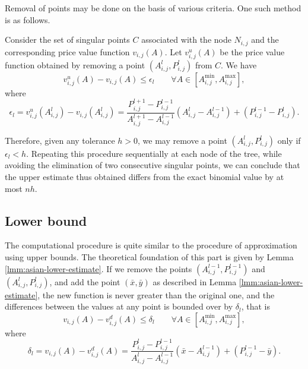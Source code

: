 Removal of points may be done on the basis of various criteria. One such method is as follows.

Consider the set of singular points $ C $ associated with the node $ N_{i,j} $ and the corresponding price value function $ v_{i,j} (A) $. Let $ v_{i,j}^u (A) $ be the price value function obtained by removing a point $ \left( A_{i,j}^{l}, P_{i,j}^{l} \right) $ from $ C $. We have
\begin{equation}
	v_{i,j}^u (A) - v_{i,j} (A)  \le  \epsilon_l  \qquad  \forall A \in \left[ A_{i,j}^{\min}, A_{i,j}^{\max} \right],
\end{equation}
where
\begin{equation}
	\epsilon_l  =  v_{i,j}^u \left( A_{i,j}^{l} \right) - v_{i,j} \left( A_{i,j}^{l} \right)  =  \frac{ P_{i,j}^{l+1} - P_{i,j}^{l-1} }{ A_{i,j}^{l+1} - A_{i,j}^{l-1} } \left( A_{i,j}^{l} - A_{i,j}^{l-1} \right) + \left( P_{i,j}^{l-1} - P_{i,j}^{l} \right) .
\end{equation}

Therefore, given any tolerance $ h > 0 $, we may remove a point $ \left( A_{i,j}^{l}, P_{i,j}^{l} \right) $ only if $ \epsilon_l < h $. Repeating this procedure sequentially at each node of the tree, while avoiding the elimination of two consecutive singular points, we can conclude that the upper estimate thus obtained differs from the exact binomial value by at most $ n h $.


\subsection{Lower bound}
\label{subsec:asian-lb}
The computational procedure is quite similar to the procedure of approximation using upper bounds. The theoretical foundation of this part is given by Lemma \ref{lmm:asian-lower-estimate}. If we remove the points $ \left( A_{i,j}^{l-1}, P_{i,j}^{l-1} \right) $ and $ \left( A_{i,j}^{l}, P_{i,j}^{l} \right) $, and add the point $ (\bar{x}, \bar{y} ) $ as described in Lemma \ref{lmm:asian-lower-estimate}, the new function is never greater than the original one, and the differences between the values at any point is bounded over by $ \delta_l $, that is
\begin{equation}
	v_{i,j} (A) - v_{i,j}^d (A)  \le  \delta_l  \qquad  \forall A \in \left[ A_{i,j}^{\min}, A_{i,j}^{\max} \right] ,
\end{equation}
where
\begin{equation}
	\delta_l  =  v_{i,j} (A) - v_{i,j}^d (A)  =  \frac{ P_{i,j}^{l} - P_{i,j}^{l-1} }{ A_{i,j}^{l} - A_{i,j}^{l-1} } \left( \bar{x} - A_{i,j}^{l-1} \right) + \left( P_{i,j}^{l-1} - \bar{y} \right) .
\end{equation}

